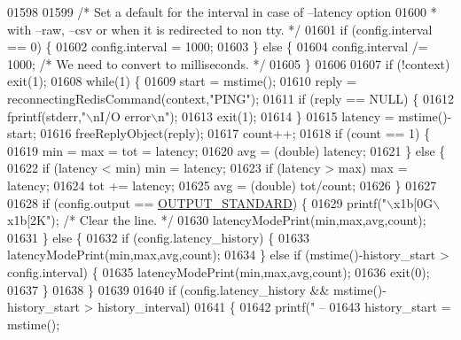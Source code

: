 \begin{DoxyCode}
{{{{{{{{{{{{{{{{{{{{{{{{{{{{{{{{{{{{{{{{{{{01598 
01599     \textcolor{comment}{/* Set a default for the interval in case of --latency option}
01600 \textcolor{comment}{     * with --raw, --csv or when it is redirected to non tty. */}
01601     \textcolor{keywordflow}{if} (config.interval == 0) \{
01602         config.interval = 1000;
01603     \} \textcolor{keywordflow}{else} \{
01604         config.interval /= 1000; \textcolor{comment}{/* We need to convert to milliseconds. */}
01605     \}
01606 
01607     \textcolor{keywordflow}{if} (!context) exit(1);
01608     \textcolor{keywordflow}{while}(1) \{
01609         start = mstime();
01610         reply = reconnectingRedisCommand(context,\textcolor{stringliteral}{"PING"});
01611         \textcolor{keywordflow}{if} (reply == NULL) \{
01612             fprintf(stderr,\textcolor{stringliteral}{"\(\backslash\)nI/O error\(\backslash\)n"});
01613             exit(1);
01614         \}
01615         latency = mstime()-start;
01616         freeReplyObject(reply);
01617         count++;
01618         \textcolor{keywordflow}{if} (count == 1) \{
01619             min = max = tot = latency;
01620             avg = (\textcolor{keywordtype}{double}) latency;
01621         \} \textcolor{keywordflow}{else} \{
01622             \textcolor{keywordflow}{if} (latency < min) min = latency;
01623             \textcolor{keywordflow}{if} (latency > max) max = latency;
01624             tot += latency;
01625             avg = (\textcolor{keywordtype}{double}) tot/count;
01626         \}
01627 
01628         \textcolor{keywordflow}{if} (config.output == \hyperlink{redis-cli_8c_abf624f04f4590979c3c3944bc7f94d6e}{OUTPUT\_STANDARD}) \{
01629             printf(\textcolor{stringliteral}{"\(\backslash\)x1b[0G\(\backslash\)x1b[2K"}); \textcolor{comment}{/* Clear the line. */}
01630             latencyModePrint(min,max,avg,count);
01631         \} \textcolor{keywordflow}{else} \{
01632             \textcolor{keywordflow}{if} (config.latency\_history) \{
01633                 latencyModePrint(min,max,avg,count);
01634             \} \textcolor{keywordflow}{else} \textcolor{keywordflow}{if} (mstime()-history\_start > config.interval) \{
01635                 latencyModePrint(min,max,avg,count);
01636                 exit(0);
01637             \}
01638         \}
01639 
01640         \textcolor{keywordflow}{if} (config.latency\_history && mstime()-history\_start > history\_interval)
01641         \{
01642             printf(\textcolor{stringliteral}{" -- %
01643             history\_start = mstime();
}}}}}}}}}}}}}}}}}}}}}}}}}}}}}}}}}}}}}}}}}}}}
\end{DoxyCode}
